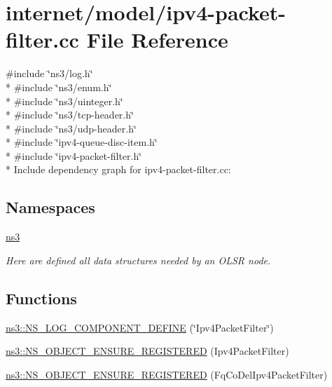 \hypertarget{ipv4-packet-filter_8cc}{}\section{internet/model/ipv4-\/packet-\/filter.cc File Reference}
\label{ipv4-packet-filter_8cc}
{\ttfamily \#include \char`\"{}ns3/log.\+h\char`\"{}}\\*
{\ttfamily \#include \char`\"{}ns3/enum.\+h\char`\"{}}\\*
{\ttfamily \#include \char`\"{}ns3/uinteger.\+h\char`\"{}}\\*
{\ttfamily \#include \char`\"{}ns3/tcp-\/header.\+h\char`\"{}}\\*
{\ttfamily \#include \char`\"{}ns3/udp-\/header.\+h\char`\"{}}\\*
{\ttfamily \#include \char`\"{}ipv4-\/queue-\/disc-\/item.\+h\char`\"{}}\\*
{\ttfamily \#include \char`\"{}ipv4-\/packet-\/filter.\+h\char`\"{}}\\*
Include dependency graph for ipv4-\/packet-\/filter.cc\+:
\subsection*{Namespaces}
\begin{DoxyCompactItemize}
\item 
 \hyperlink{namespacens3}{ns3}
\begin{DoxyCompactList}\small\item\em Here are defined all data structures needed by an O\+L\+SR node. \end{DoxyCompactList}\end{DoxyCompactItemize}
\subsection*{Functions}
\begin{DoxyCompactItemize}
\item 
\hyperlink{namespacens3_a1857c005c3eceaa8a780bb96920f6d94}{ns3\+::\+N\+S\+\_\+\+L\+O\+G\+\_\+\+C\+O\+M\+P\+O\+N\+E\+N\+T\+\_\+\+D\+E\+F\+I\+NE} (\char`\"{}Ipv4\+Packet\+Filter\char`\"{})
\item 
\hyperlink{namespacens3_acfdd4d04e4dfc2483378a5984eb38d75}{ns3\+::\+N\+S\+\_\+\+O\+B\+J\+E\+C\+T\+\_\+\+E\+N\+S\+U\+R\+E\+\_\+\+R\+E\+G\+I\+S\+T\+E\+R\+ED} (Ipv4\+Packet\+Filter)
\item 
\hyperlink{namespacens3_a454cbb0f90a37f59039a321bc72dc8e0}{ns3\+::\+N\+S\+\_\+\+O\+B\+J\+E\+C\+T\+\_\+\+E\+N\+S\+U\+R\+E\+\_\+\+R\+E\+G\+I\+S\+T\+E\+R\+ED} (Fq\+Co\+Del\+Ipv4\+Packet\+Filter)
\end{DoxyCompactItemize}
